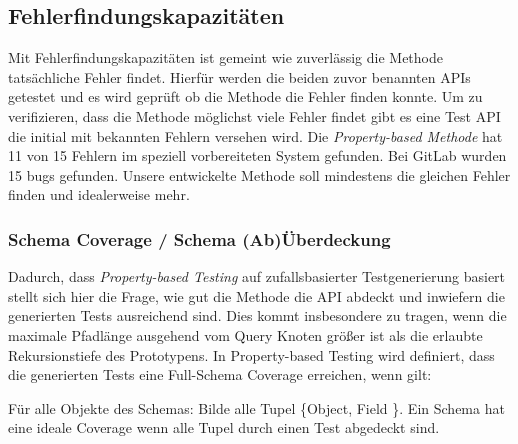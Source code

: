 \subsection{Fehlerfindungskapazitäten}

Mit Fehlerfindungskapazitäten ist gemeint wie zuverlässig die Methode tatsächliche Fehler findet.
Hierfür werden die beiden zuvor benannten APIs getestet und es wird geprüft ob die Methode die Fehler finden konnte.
Um zu verifizieren, dass die Methode möglichst viele Fehler findet gibt es eine Test API die
initial mit bekannten Fehlern versehen wird.
Die \textit{Property-based Methode} hat 11 von 15 Fehlern im speziell vorbereiteten System gefunden.
Bei GitLab wurden 15 bugs gefunden.
Unsere entwickelte Methode soll mindestens die gleichen Fehler finden und idealerweise mehr.

\subsubsection{Schema Coverage / Schema (Ab)Überdeckung}

Dadurch, dass \textit{Property-based Testing} auf zufallsbasierter Testgenerierung basiert stellt sich hier die Frage, wie gut die Methode
die API abdeckt und inwiefern die generierten Tests ausreichend sind.
Dies kommt insbesondere zu tragen, wenn die maximale Pfadlänge ausgehend vom Query Knoten größer ist als die erlaubte Rekursionstiefe des Prototypens.
In Property-based Testing wird definiert, dass die generierten Tests eine Full-Schema Coverage erreichen, wenn gilt:

\begin{definition}
    Für alle Objekte des Schemas: Bilde alle Tupel \{Object, Field \}.
    Ein Schema hat eine ideale Coverage wenn alle Tupel durch einen Test abgedeckt sind.
\end{definition}

